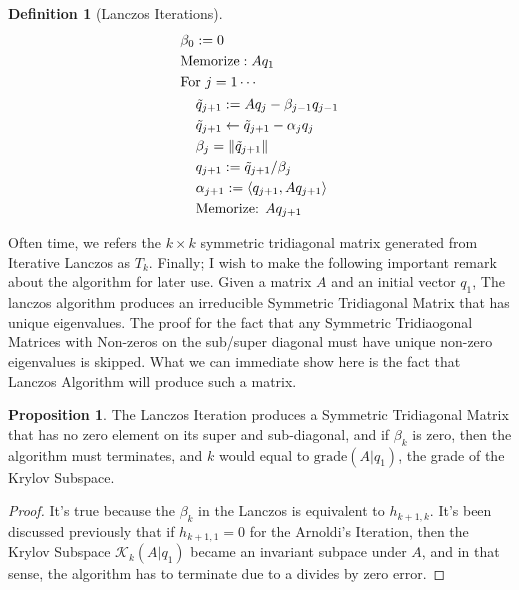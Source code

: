 \documentclass[]{article}
\theoremstyle{definition}
\newtheorem{prop}{Proposition}[section]  %
\newtheorem{definition}{Definition}
\begin{document}
\begin{definition}[Lanczos Iterations]
\begin{align}
\begin{aligned}
                        & \beta_0 := 0
                        \\
                        & \text{Memorize}: Aq_1
                        \\
                        & \text{For }j = 1\cdots
                        \\
                        &\hspace{1.1em}
                        \begin{aligned}
                            & \tilde{q}_{j + 1} := Aq_j - \beta_{j - 1} q_{j - 1}
                            \\
                            & \tilde{q}_{j + 1} \leftarrow \tilde{q}_{j + 1} - \alpha_jq_j
                            \\
                            & \beta_j = \Vert \tilde{q}_{j + 1}\Vert
                            \\
                            & q_{j + 1}:= \tilde{q}_{j + 1}/\beta_j
                            \\
                            & \alpha_{j + 1} := \left\langle q_{j + 1}, Aq_{j + 1} \right\rangle
                            \\
                            & \text{Memorize: }Aq_{j + 1}
                        \end{aligned}
                    \end{aligned}
                \end{align}
            \end{definition}
            Often time, we refers the $k\times k$ symmetric tridiagonal matrix generated from Iterative Lanczos as $T_k$. Finally; I wish to make the following important remark about the algorithm for later use. Given a matrix $A$ and an initial vector $q_1$, The lanczos algorithm produces an irreducible Symmetric Tridiagonal Matrix that has unique eigenvalues. The proof for the fact that any Symmetric Tridiaogonal Matrices with Non-zeros on the sub/super diagonal must have unique non-zero eigenvalues is skipped. What we can immediate show here is the fact that Lanczos Algorithm will produce such a matrix. 
            \begin{prop}
                The Lanczos Iteration produces a Symmetric Tridiagonal Matrix that has no zero element on its super and sub-diagonal, and if $\beta_k$ is zero, then the algorithm must terminates, and $k$ would equal to $\text{grade}(A|q_1)$, the grade of the Krylov Subspace. 
            \end{prop}
            \begin{proof}
                It's true because the $\beta_{k}$ in the Lanczos is equivalent to $h_{k + 1, k}$. It's been discussed previously that if $h_{k + 1, 1} = 0$ for the Arnoldi's Iteration, then the Krylov Subspace $\mathcal K_k(A|q_1)$ became an invariant subpace under $A$, and in that sense, the algorithm has to terminate due to a divides by zero error. 
            \end{proof}
\end{document}
